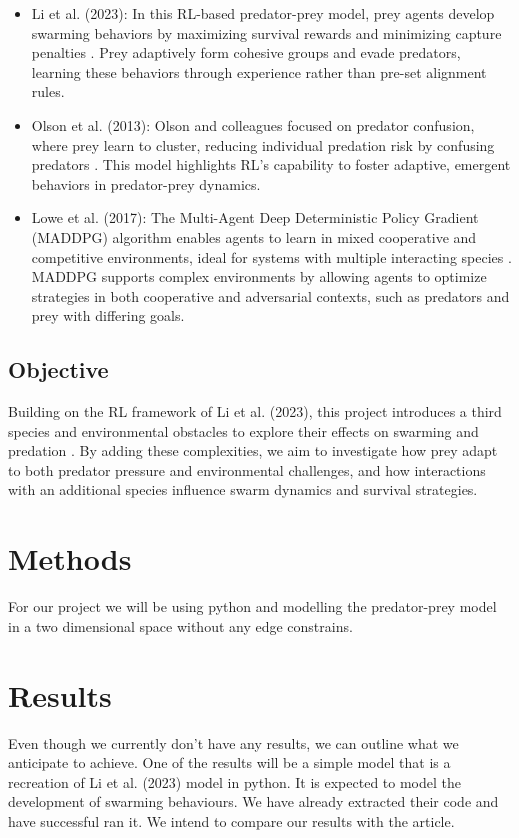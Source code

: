 \documentclass[9pt]{pnas-new}
\begin{document}
\begin{itemize}
    \item Li et al. (2023): In this RL-based predator-prey model, prey agents develop swarming behaviors by maximizing survival rewards and minimizing capture penalties \cite{}. Prey adaptively form cohesive groups and evade predators, learning these behaviors through experience rather than pre-set alignment rules.

    \item Olson et al. (2013): Olson and colleagues focused on predator confusion, where prey learn to cluster, reducing individual predation risk by confusing predators \cite{}. This model highlights RL’s capability to foster adaptive, emergent behaviors in predator-prey dynamics.

    \item Lowe et al. (2017): The Multi-Agent Deep Deterministic Policy Gradient (MADDPG) algorithm enables agents to learn in mixed cooperative and competitive environments, ideal for systems with multiple interacting species \cite{}. MADDPG supports complex environments by allowing agents to optimize strategies in both cooperative and adversarial contexts, such as predators and prey with differing goals.
\end{itemize}

\subsection{Objective}

Building on the RL framework of Li et al. (2023), this project introduces a third species and environmental obstacles to explore their effects on swarming and predation \cite{}. By adding these complexities, we aim to investigate how prey adapt to both predator pressure and environmental challenges, and how interactions with an additional species influence swarm dynamics and survival strategies.



\section*{Methods}

For our project we will be using python and modelling the predator-prey model in a two dimensional space without any edge constrains. 


\section*{Results}
Even though we currently don't have any results, we can outline what we anticipate to achieve. One of the results will be a simple model that is a recreation of Li et al. (2023) model in python. It is expected to model the development of swarming behaviours.  We have already extracted their code and have successful ran it. We intend to compare our results with the article.
\end{document}

